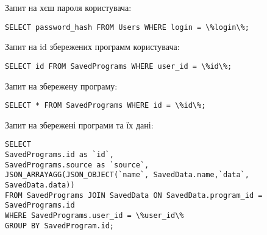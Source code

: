 Запит на хєш пароля користувача:

\begin{verbatim}
SELECT password_hash FROM Users WHERE login = \%login\%; 
\end{verbatim}

Запит на id збережених программ користувача:

\begin{verbatim}
SELECT id FROM SavedPrograms WHERE user_id = \%id\%; 
\end{verbatim}

Запит на збережену програму:

\begin{verbatim}
SELECT * FROM SavedPrograms WHERE id = \%id\%; 
\end{verbatim}

Запит на збережені програми та їх дані:

\begin{verbatim}
SELECT 
SavedPrograms.id as `id`,  
SavedPrograms.source as `source`,
JSON_ARRAYAGG(JSON_OBJECT(`name`, SavedData.name,`data`, SavedData.data))
FROM SavedPrograms JOIN SavedData ON SavedData.program_id = SavedPrograms.id
WHERE SavedPrograms.user_id = \%user_id\%
GROUP BY SavedProgram.id;
\end{verbatim}

